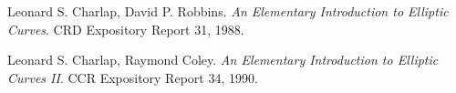 \begin{thebibliography}{99}

    Leonard S. Charlap, David P. Robbins.
    \emph{An Elementary Introduction to Elliptic Curves}.
    CRD Expository Report 31, 1988.

    Leonard S. Charlap, Raymond Coley.
    \emph{An Elementary Introduction to Elliptic Curves II}.
    CCR Expository Report 34, 1990.

\end{thebibliography}
